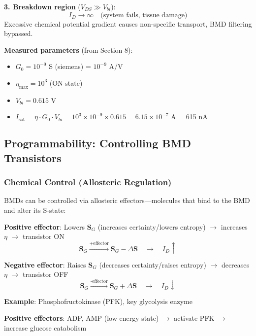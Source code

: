 \documentclass[11pt,a4paper]{article}
\begin{document}
\textbf{3. Breakdown region} ($V_{DS} \gg V_{bi}$):
\begin{equation}
I_D \to \infty \quad \text{(system fails, tissue damage)}
\end{equation}
Excessive chemical potential gradient causes non-specific transport, BMD filtering bypassed.

\textbf{Measured parameters} (from Section 8):
\begin{itemize}
\item $G_0 = 10^{-9}$ S (siemens) = $10^{-9}$ A/V
\item $\eta_{\max} = 10^3$ (ON state)
\item $V_{bi} = 0.615$ V
\item $I_{\text{sat}} = \eta \cdot G_0 \cdot V_{bi} = 10^3 \times 10^{-9} \times 0.615 = 6.15 \times 10^{-7}$ A = 615 nA
\end{itemize}

\subsection{Programmability: Controlling BMD Transistors}

\subsubsection{Chemical Control (Allosteric Regulation)}

BMDs can be controlled via allosteric effectors—molecules that bind to the BMD and alter its S-state:

\textbf{Positive effector}: Lowers $\mathbf{S}_G$ (increases certainty/lowers entropy) $\to$ increases $\eta$ $\to$ transistor ON
\begin{equation}
\mathbf{S}_G \xrightarrow{\text{+effector}} \mathbf{S}_G - \Delta \mathbf{S} \quad \to \quad I_D \uparrow
\end{equation}

\textbf{Negative effector}: Raises $\mathbf{S}_G$ (decreases certainty/raises entropy) $\to$ decreases $\eta$ $\to$ transistor OFF
\begin{equation}
\mathbf{S}_G \xrightarrow{\text{-effector}} \mathbf{S}_G + \Delta \mathbf{S} \quad \to \quad I_D \downarrow
\end{equation}

\textbf{Example}: Phosphofructokinase (PFK), key glycolysis enzyme

\textbf{Positive effectors}: ADP, AMP (low energy state) $\to$ activate PFK $\to$ increase glucose catabolism
\end{document}
